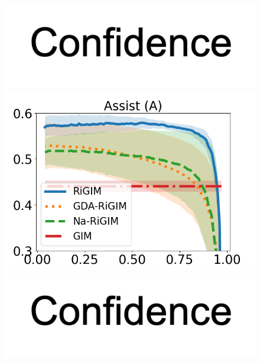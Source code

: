 \documentclass[letterpaper]{article} %
\begin{document}
\begin{figure}[htbp]
\begin{minipage}{0.16\textwidth}
    \vspace{-0.05in}
    \includegraphics[scale=0.12]{figures/confidence_x_label.png}
    \end{minipage}
    \begin{minipage}{0.16\textwidth}
    \centering
    \includegraphics[scale=0.14]{figures/soccer_risk_curve_Assists_shadow.png}\par
    \vspace{-0.05in}
    \includegraphics[scale=0.12]{figures/confidence_x_label.png}
    \end{minipage}
    \begin{minipage}{0.16\textwidth}
    \centering

\end{minipage}
\end{figure}
\end{document}
